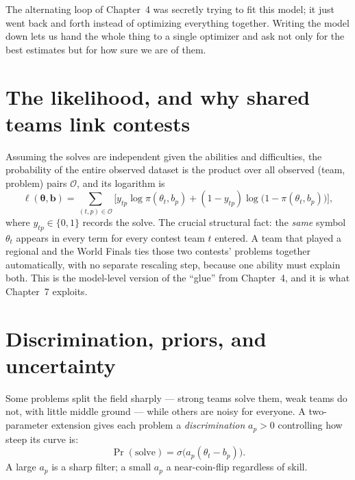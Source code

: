 \documentclass[11pt]{report}
\newcommand{\Obs}{\mathcal{O}}
\theoremstyle{definition}
\numberwithin{equation}{chapter}
\begin{document}
\begin{intuition}
The alternating loop of Chapter~4 was secretly trying to fit this model; it just
went back and forth instead of optimizing everything together. Writing the model
down lets us hand the whole thing to a single optimizer and ask not only for the
best estimates but for how sure we are of them.
\end{intuition}

\section{The likelihood, and why shared teams link contests}

Assuming the solves are independent given the abilities and difficulties, the
probability of the entire observed dataset is the product over all observed
(team, problem) pairs $\Obs$, and its logarithm is
\begin{equation}\label{eq:loglik}
  \ell(\bm\theta,\bm b)=\sum_{(t,p)\in\Obs}
  \Big[y_{tp}\log\pi(\theta_t,b_p)+(1-y_{tp})\log\big(1-\pi(\theta_t,b_p)\big)\Big],
\end{equation}
where $y_{tp}\in\{0,1\}$ records the solve. The crucial structural fact: the
\emph{same} symbol $\theta_t$ appears in every term for every contest team $t$
entered. A team that played a regional and the World Finals ties those two
contests' problems together automatically, with no separate rescaling step,
because one ability must explain both. This is the model-level version of the
``glue'' from Chapter~4, and it is what Chapter~7 exploits.

\section{Discrimination, priors, and uncertainty}

Some problems split the field sharply --- strong teams solve them, weak teams do
not, with little middle ground --- while others are noisy for everyone. A
two-parameter extension gives each problem a \emph{discrimination} $a_p>0$
controlling how steep its curve is:
\begin{equation}\label{eq:twopl}
  \Pr(\text{solve})=\sigma\!\big(a_p(\theta_t-b_p)\big).
\end{equation}
A large $a_p$ is a sharp filter; a small $a_p$ a near-coin-flip regardless of
skill.
\end{document}
